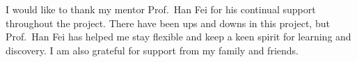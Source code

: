 \documentclass[
hidelinks,
12pt, %
oneside, %
english, %
doublespacing, %
headsepline, %
]{MastersDoctoralThesis} %
\author{} %
\begin{document}
\frontmatter 
\pagestyle{plain} 

\begin{titlepage}


\end{titlepage}

\begin{acknowledgements}
\addchaptertocentry{\acknowledgementname} %
    I would like to thank my mentor Prof.~Han Fei for his continual support throughout the project. There have been ups and downs in this project, but Prof.~Han Fei has helped me stay flexible and keep a keen spirit for learning and discovery. I am also grateful for support from my family and friends.
\end{acknowledgements}
\end{document}
